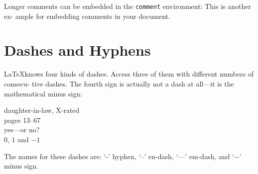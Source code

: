 \documentclass{article}
\begin{document}
Longer comments can be embedded in the \texttt{comment} environment: This is another ex-
ample for embedding comments in your document.

\section{Dashes and Hyphens}

\LaTeX knows four kinds of dashes. Access three of them with different numbers of consecu-
tive dashes. The fourth sign is actually not a dash at all—it is the mathematical minus
sign:

\begin{center}
daughter-in-law, X-rated\\
pages 13--67\\
yes---or no? \\
$0$, $1$ and $-1$
\end{center}

The names for these dashes are: ‘-’ hyphen, ‘--’ en-dash, ‘---’ em-dash,
and ‘$-$’ minus sign.
\end{document}
